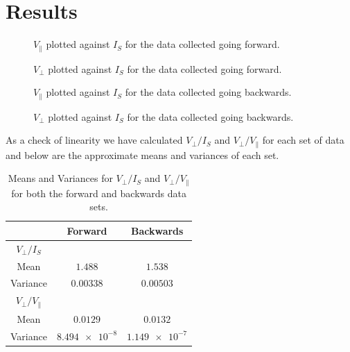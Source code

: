 \documentclass[12pt]{article}
\numberwithin{equation}{section}
\numberwithin{figure}{section}
\numberwithin{table}{section}
\begin{document}
    \section{Results}\label{sec:Results}
    \begin{figure}[H]
        \begin{center}
           \caption{$V_\parallel$ plotted against $I_S$ for the data collected going forward.}
           \label{fig:ForwardParallel}
        \end{center}
    \end{figure}
    \begin{figure}[H]
        \begin{center}
           \caption{$V_\perp$ plotted against $I_S$ for the data collected going forward.}
           \label{fig:ForwardPerp}
        \end{center}
    \end{figure}
    \begin{figure}[H]
        \begin{center}
           \caption{$V_\parallel$ plotted against $I_S$ for the data collected going backwards.}
           \label{fig:BackwardParallel}
        \end{center}
    \end{figure}
    \begin{figure}[H]
        \begin{center}
           \caption{$V_\perp$ plotted against $I_S$ for the data collected going backwards.}
           \label{fig:BackwardPerp}
        \end{center}
    \end{figure}
    As a check of linearity we have calculated $V_\perp/I_S$ and $V_\perp/V_\parallel$ for each 
    set of data and below are the approximate means and variances of each set.
    \begin{table}[H]
        \centering
        \begin{tabular}{c|c|c}
             & Forward & Backwards \\
            \hline
            $V_\perp/I_S$ & & \\
            Mean & $1.488$ & $1.538$ \\
            Variance & $0.00338$ & $0.00503$ \\
            \hline
            $V_\perp/V_\parallel$ & & \\
            Mean & $0.0129$ & $0.0132$ \\
            Variance & $\num{8.494e-8}$ & $\num{1.149e-7}$ \\
        \end{tabular}
        \caption{Means and Variances for $V_\perp/I_S$ and $V_\perp/V_\parallel$ for both the 
        forward and backwards data sets.}
        \label{tbl:MeanVariance}
    \end{table}
\end{document}
